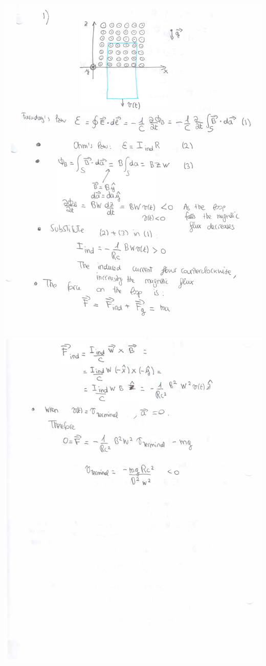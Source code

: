 \documentclass[makesolutionspdf]{esg8022pset}
\begin{document}
\begin{solution}
  \begin{center}
    \includegraphics[width = \textwidth, height = 0.9\textheight, keepaspectratio]{ps9_1a}
    \clearpage
    \includegraphics[width = \textwidth, height = 0.9\textheight, keepaspectratio]{ps9_1b}

\end{center}
\end{solution}
\end{document}
